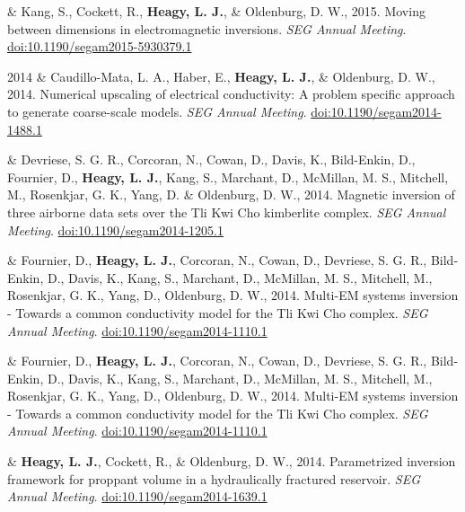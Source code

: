 \documentclass[a4paper, 11pt]{article}
\newcommand{\doi}[1]{\href{https://doi.org/#1}{doi:#1}}
\begin{document}
\begin{entryright}
& Kang, S., Cockett, R., \textbf{Heagy, L. J.}, \& Oldenburg, D. W., 2015. Moving between dimensions in electromagnetic inversions. \emph{SEG Annual Meeting}. \doi{10.1190/segam2015-5930379.1}
\end{entryright}

\begin{entryright}
2014 & Caudillo-Mata, L. A., Haber, E., \textbf{Heagy, L. J.}, \& Oldenburg, D. W., 2014. Numerical upscaling of electrical conductivity: A problem specific approach to generate coarse-scale models. \emph{SEG Annual Meeting}. \doi{10.1190/segam2014-1488.1}
\end{entryright}

\begin{entryright}
& Devriese, S. G. R., Corcoran, N., Cowan, D., Davis, K., Bild-Enkin, D., Fournier, D., \textbf{Heagy, L. J.}, Kang, S., Marchant, D., McMillan, M. S., Mitchell, M., Rosenkjar, G. K., Yang, D. \& Oldenburg, D. W., 2014. Magnetic inversion of three airborne data sets over the Tli Kwi Cho kimberlite complex. \emph{SEG Annual Meeting}. \doi{10.1190/segam2014-1205.1}
\end{entryright}

\begin{entryright}
& Fournier, D., \textbf{Heagy, L. J.}, Corcoran, N., Cowan, D., Devriese, S. G. R., Bild-Enkin, D., Davis, K., Kang, S., Marchant, D., McMillan, M. S., Mitchell, M., Rosenkjar, G. K., Yang, D., Oldenburg, D. W., 2014. Multi-EM systems inversion - Towards a common conductivity model for the Tli Kwi Cho complex. \emph{SEG Annual Meeting}. \doi{10.1190/segam2014-1110.1}
\end{entryright}

\begin{entryright}
& Fournier, D., \textbf{Heagy, L. J.}, Corcoran, N., Cowan, D., Devriese, S. G. R., Bild-Enkin, D., Davis, K., Kang, S., Marchant, D., McMillan, M. S., Mitchell, M., Rosenkjar, G. K., Yang, D., Oldenburg, D. W., 2014. Multi-EM systems inversion - Towards a common conductivity model for the Tli Kwi Cho complex. \emph{SEG Annual Meeting}. \doi{10.1190/segam2014-1110.1}
\end{entryright}

\begin{entryright}
& \textbf{Heagy, L. J.}, Cockett, R., \& Oldenburg, D. W., 2014. Parametrized inversion framework for proppant volume in a hydraulically fractured reservoir. \emph{SEG Annual Meeting}. \doi{10.1190/segam2014-1639.1}
\end{entryright}
\end{document}
